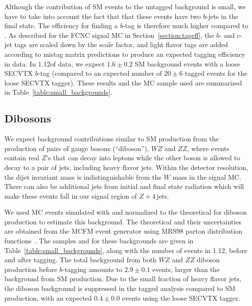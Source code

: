 Although the contribution of SM \ttbar events to the untagged
background is small, we have to take into account the fact that 
that these events have two $b$-jets in the final state. The efficiency for
finding a $b$-tag is therefore much higher compared to \Zj. As described for the
FCNC signal MC in Section~\ref{section:tageff}, the $b$- and $c$-jet
tags are scaled down by the scale factor, and light flavor tags are
added according to mistag matrix predictions to produce an expected
tagging efficiency in data. In 1.12\invfb of data, we expect $1.6\pm
0.2$ SM \ttbar background events with a loose SECVTX $b$-tag
(compared to an expected number of $20 \pm 6$ tagged \Zj events 
for the loose SECVTX tagger). These results and the MC sample used are
summarized in Table~\ref{table:small_backgrounds}.

\subsection{Dibosons}
We expect background contributions similar to SM \ttbar production
from the production of pairs of gauge bosons (``diboson''), 
$WZ$ and $ZZ$, where events contain real $Z$'s that can
decay into leptons while the other boson is allowed to decay to a pair
of jets, including heavy flavor jets.  Within the detector resolution,
the dijet invariant mass is indistinguishable from the $W$ mass in the
signal MC. There can also be additional jets from initial and final
state radiation which will make these events fall in our signal region
of $Z+4$\,jets.  

We used MC events simulated with \pyth and normalized to the
theoretical \xsects for diboson production to estimate this
background. The theoretical \xsects and their uncertainties are
obtained from the MCFM event generator using MRS98 parton distribution
functions~\cite{Campbell:1999ah}. The samples and \xsects for these
backgrounds are given in Table~\ref{table:small_backgrounds}, along with 
the number of events in 1.12\invfb, before and after tagging. The total
background from both $WZ$ and $ZZ$ diboson production before $b$-tagging 
amounts to $2.9\pm 0.1$ events, larger than the background from SM \ttbar
production. Due to the small fraction of heavy flavor jets, the
diboson background is suppressed in the tagged analysis compared to SM
\ttbar production, with an expected $0.4 \pm 0.0$ events using the
loose SECVTX tagger.


